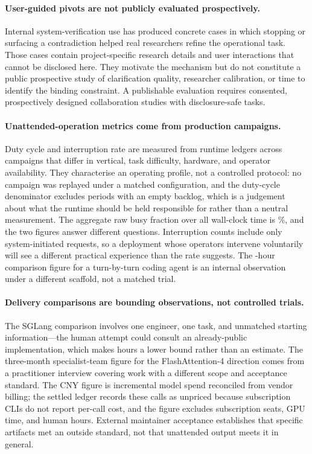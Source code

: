 \paragraph{User-guided pivots are not publicly evaluated prospectively.}
Internal system-verification use has produced concrete cases in which stopping or
surfacing a contradiction helped real researchers refine the operational task.
Those cases contain project-specific research details and user interactions that
cannot be disclosed here. They motivate the mechanism but do not constitute a
public prospective study of clarification quality, researcher calibration, or time
to identify the binding constraint. A publishable evaluation requires consented,
prospectively designed collaboration studies with disclosure-safe tasks.

\paragraph{Unattended-operation metrics come from production campaigns.}
Duty cycle and interruption rate are measured from runtime ledgers across campaigns
that differ in vertical, task difficulty, hardware, and operator availability. They
characterise an operating profile, not a controlled protocol: no campaign was
replayed under a matched configuration, and the duty-cycle denominator excludes
periods with an empty backlog, which is a judgement about what the runtime should be
held responsible for rather than a neutral measurement. The aggregate raw busy
fraction over all wall-clock time is \DutyCycleRaw\%, and the two figures answer
different questions. Interruption counts include only system-initiated requests, so a
deployment whose operators intervene voluntarily will see a different practical
experience than the rate suggests. The \CodexEndurance{}-hour comparison figure for a
turn-by-turn coding agent is an internal observation under a different scaffold, not
a matched trial.

\paragraph{Delivery comparisons are bounding observations, not controlled trials.}
The SGLang comparison involves one engineer, one task, and unmatched starting
information---the human attempt could consult an already-public implementation, which
makes \SGLangHumanHours{} hours a lower bound rather than an estimate. The
three-month specialist-team figure for the FlashAttention-4 direction comes from a
practitioner interview covering work with a different scope and acceptance standard.
The \FlashDACostCNY{} CNY figure is incremental model spend reconciled from vendor
billing; the settled ledger records these calls as unpriced because subscription CLIs
do not report per-call cost, and the figure excludes subscription seats, GPU time,
and human hours. External maintainer acceptance establishes that specific artifacts
met an outside standard, not that unattended output meets it in general.


